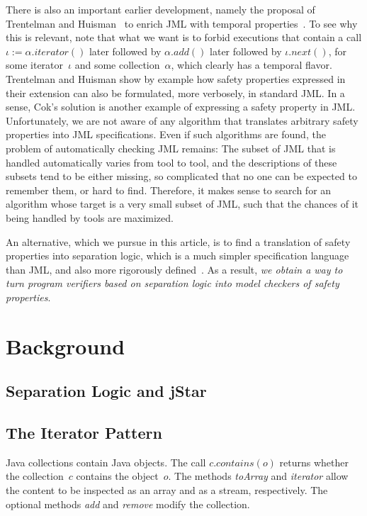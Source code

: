 \documentclass[a4paper]{article}
\theoremstyle{remark}
\begin{document}
There is also an important earlier development, namely the proposal of Trentelman and Huisman~\cite{trentelman2002} to enrich JML with temporal properties~\cite{pnueli1977}.
To see why this is relevant, note that what we want is to forbid executions that contain a call $\iota:=\alpha.\mathit{iterator}()$ later followed by $\alpha.\mathit{add}()$ later followed by $\iota.\mathit{next}()$, for some iterator~$\iota$ and some collection~$\alpha$, which clearly has a temporal flavor.
Trentelman and Huisman show by example how safety properties expressed in their extension can also be formulated, more verbosely, in standard JML\null.
In a sense, Cok's solution is another example of expressing a safety property in JML\null.
Unfortunately, we are not aware of any algorithm that translates arbitrary safety properties into JML specifications.
Even if such algorithms are found, the problem of automatically checking JML remains:
The subset of JML that is handled automatically varies from tool to tool, and the descriptions of these subsets tend to be either missing, so complicated that no one can be expected to remember them, or hard to find.
Therefore, it makes sense to search for an algorithm whose target is a very small subset of JML, such that the chances of it being handled by tools are maximized.

An alternative, which we pursue in this article, is to find a translation of safety properties into separation logic, which is a much simpler specification language than JML, and also more rigorously defined~\cite{reynolds2002}. 
As a result, \emph{we obtain a way to turn program verifiers based on separation logic into model checkers of safety properties}.

\section{Background}

\subsection{Separation Logic and jStar}
\subsection{The Iterator Pattern}


Java collections contain Java objects.
The call $c.\mathit{contains}(o)$ returns whether the collection~$c$ contains the object~$o$.
The methods \textit{toArray} and \textit{iterator} allow the content to be inspected as an array and as a stream, respectively.
The optional methods \textit{add} and \textit{remove} modify the collection.
\end{document}
